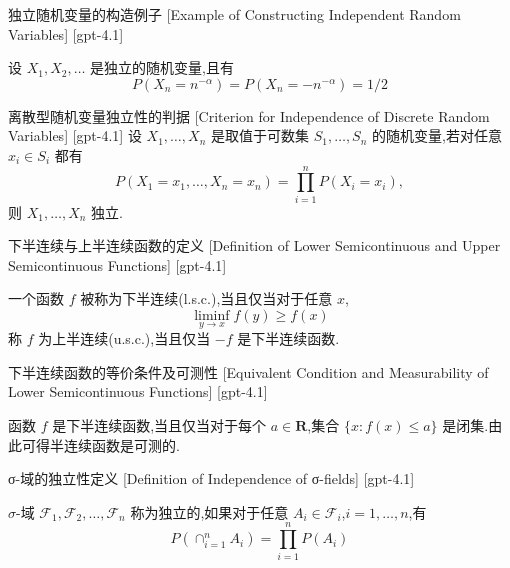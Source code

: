 \documentclass[UTF8]{ctexart}
\begin{document}
    \begin{xmp}
        {独立随机变量的构造例子}
        [Example of Constructing Independent Random Variables]
        [gpt-4.1]
        
设 $X_{1}, X_{2}, \dots$ 是独立的随机变量,且有
\[
P(X_{n} = n^{-\alpha}) = P(X_{n} = -n^{-\alpha}) = 1/2
\]

    \end{xmp}
    
    
    
    \begin{thm}
        {离散型随机变量独立性的判据}
        [Criterion for Independence of Discrete Random Variables]
        [gpt-4.1]
        设 $X_{1}, \ldots, X_{n}$ 是取值于可数集 $S_{1}, \ldots, S_{n}$ 的随机变量,若对任意 $x_{i} \in S_{i}$ 都有
\[
P(X_{1} = x_{1}, \ldots, X_{n} = x_{n}) = \prod_{i=1}^{n} P(X_{i} = x_{i}),
\]
则 $X_{1}, \ldots, X_{n}$ 独立.
    \end{thm}
    
    
    
    \begin{dfn}
        {下半连续与上半连续函数的定义}
        [Definition of Lower Semicontinuous and Upper Semicontinuous Functions]
        [gpt-4.1]
        
一个函数 $f$ 被称为下半连续(l.s.c.),当且仅当对于任意 $x$,
\[
\liminf_{y \to x} f(y) \geq f(x)
\]
称 $f$ 为上半连续(u.s.c.),当且仅当 $-f$ 是下半连续函数.

    \end{dfn}
    
    
    
    \begin{thm}
        {下半连续函数的等价条件及可测性}
        [Equivalent Condition and Measurability of Lower Semicontinuous Functions]
        [gpt-4.1]
        
函数 $f$ 是下半连续函数,当且仅当对于每个 $a \in \mathbf{R}$,集合 $\{ x : f(x) \leq a \}$ 是闭集.由此可得半连续函数是可测的.

    \end{thm}
    
    
    
    \begin{dfn}
        {σ-域的独立性定义}
        [Definition of Independence of σ-fields]
        [gpt-4.1]
        
$\sigma$-域 $\mathcal{F}_1, \mathcal{F}_2, \ldots, \mathcal{F}_n$ 称为独立的,如果对于任意 $A_i \in \mathcal{F}_i$,$i = 1, \ldots, n$,有
\[
P\left(\cap_{i=1}^n A_i\right) = \prod_{i=1}^n P(A_i)
\]

    \end{dfn}
    
\end{document}
